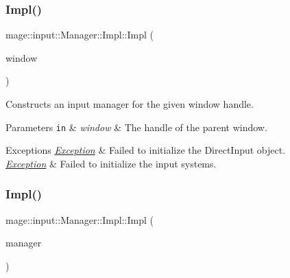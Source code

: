 \subsubsection{\texorpdfstring{Impl()}{Impl()}\hspace{0.1cm}{\footnotesize\ttfamily [1/3]}}
{\footnotesize\ttfamily mage\+::input\+::\+Manager\+::\+Impl\+::\+Impl (\begin{DoxyParamCaption}\item[{\mbox{\hyperlink{namespacemage_a8769f9d670d6b585ea306cb1062af94b}{Not\+Null}}$<$ H\+W\+ND $>$}]{window }\end{DoxyParamCaption})\hspace{0.3cm}{\ttfamily [explicit]}}

Constructs an input manager for the given window handle.


\begin{DoxyParams}[1]{Parameters}
\mbox{\tt in}  & {\em window} & The handle of the parent window. \\
\hline
\end{DoxyParams}

\begin{DoxyExceptions}{Exceptions}
{\em \mbox{\hyperlink{classmage_1_1_exception}{Exception}}} & Failed to initialize the Direct\+Input object. \\
\hline
{\em \mbox{\hyperlink{classmage_1_1_exception}{Exception}}} & Failed to initialize the input systems. \\
\hline
\end{DoxyExceptions}
\mbox{\label{classmage_1_1input_1_1_manager_1_1_impl_a9c1f7ee1af99eb2811820d622850dc06}} 
\subsubsection{\texorpdfstring{Impl()}{Impl()}\hspace{0.1cm}{\footnotesize\ttfamily [2/3]}}
{\footnotesize\ttfamily mage\+::input\+::\+Manager\+::\+Impl\+::\+Impl (\begin{DoxyParamCaption}\item[{const \mbox{\hyperlink{classmage_1_1input_1_1_manager_1_1_impl}{Impl}} \&}]{manager }\end{DoxyParamCaption})\hspace{0.3cm}{\ttfamily [delete]}}

